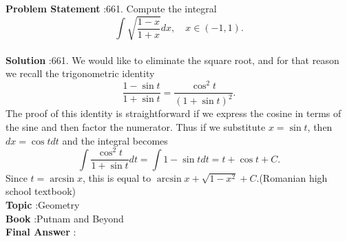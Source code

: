 \documentclass[10pt]{article}
\begin{document}
\textbf{Problem Statement} :661. Compute the integral$$ \int \sqrt{\frac{1-x}{1+x}} d x, \quad x \in(-1,1) . $$\\
\textbf{Solution} :661. We would like to eliminate the square root, and for that reason we recall the trigonometric identity$$ \frac{1-\sin t}{1+\sin t}=\frac{\cos ^{2} t}{(1+\sin t)^{2}} . $$The proof of this identity is straightforward if we express the cosine in terms of the sine and then factor the numerator. Thus if we substitute $x=\sin t$, then $d x=\cos t d t$ and the integral becomes$$ \int \frac{\cos ^{2} t}{1+\sin t} d t=\int 1-\sin t d t=t+\cos t+C . $$Since $t=\arcsin x$, this is equal to $\arcsin x+\sqrt{1-x^{2}}+C$.(Romanian high school textbook)\\
\textbf{Topic} :Geometry\\
\textbf{Book} :Putnam and Beyond\\
\textbf{Final Answer} :\\
\end{document}
